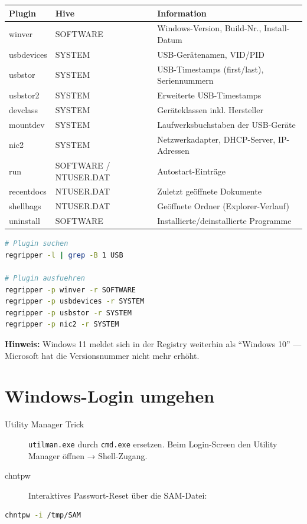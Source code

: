 \begin{center}
\begin{tabular}{lll}
    \toprule
    \textbf{Plugin} & \textbf{Hive} & \textbf{Information} \\
    \midrule
    winver & SOFTWARE & Windows-Version, Build-Nr., Install-Datum \\
    usbdevices & SYSTEM & USB-Gerätenamen, VID/PID \\
    usbstor & SYSTEM & USB-Timestamps (first/last), Seriennummern \\
    usbstor2 & SYSTEM & Erweiterte USB-Timestamps \\
    devclass & SYSTEM & Geräteklassen inkl. Hersteller \\
    mountdev & SYSTEM & Laufwerksbuchstaben der USB-Geräte \\
    nic2 & SYSTEM & Netzwerkadapter, DHCP-Server, IP-Adressen \\
    run & SOFTWARE / NTUSER.DAT & Autostart-Einträge \\
    recentdocs & NTUSER.DAT & Zuletzt geöffnete Dokumente \\
    shellbags & NTUSER.DAT & Geöffnete Ordner (Explorer-Verlauf) \\
    uninstall & SOFTWARE & Installierte/deinstallierte Programme \\
    \bottomrule
\end{tabular}
\end{center}

\begin{lstlisting}[language=bash]
# Plugin suchen
regripper -l | grep -B 1 USB

# Plugin ausfuehren
regripper -p winver -r SOFTWARE
regripper -p usbdevices -r SYSTEM
regripper -p usbstor -r SYSTEM
regripper -p nic2 -r SYSTEM
\end{lstlisting}

\textbf{Hinweis:} Windows 11 meldet sich in der Registry weiterhin als ``Windows 10'' — Microsoft hat die Versionsnummer nicht mehr erhöht.

\section{Windows-Login umgehen}

\begin{description}
    \item[Utility Manager Trick] \texttt{utilman.exe} durch \texttt{cmd.exe} ersetzen.
    Beim Login-Screen den Utility Manager öffnen → Shell-Zugang.
    \item[chntpw] Interaktives Passwort-Reset über die SAM-Datei:
\end{description}

\begin{lstlisting}[language=bash]
chntpw -i /tmp/SAM
\end{lstlisting}
